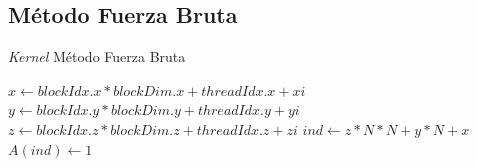 \documentclass[10pt, conference, compsocconf, onecolumn]{IEEEtran}
\begin{document}
\subsection{M\'etodo Fuerza Bruta}
\label{ssec_fuerza_bruta}

\begin{algorithm}[H]
	\centering
	\caption{\textit{Kernel} M\'etodo Fuerza Bruta}

	\begin{algorithmic}[1]
		\State $x\gets blockIdx.x*blockDim.x+threadIdx.x+xi $
		\State $y\gets blockIdx.y*blockDim.y+threadIdx.y+yi$
		\State $z\gets blockIdx.z*blockDim.z+threadIdx.z+zi$
		\State $ind\gets z*N*N+y*N+x$
		\State $A(ind)\gets 1 $
		
		\EndIf\
		\EndIf\
		\EndFunction
	\end{algorithmic}
\end{algorithm}









\end{document}
